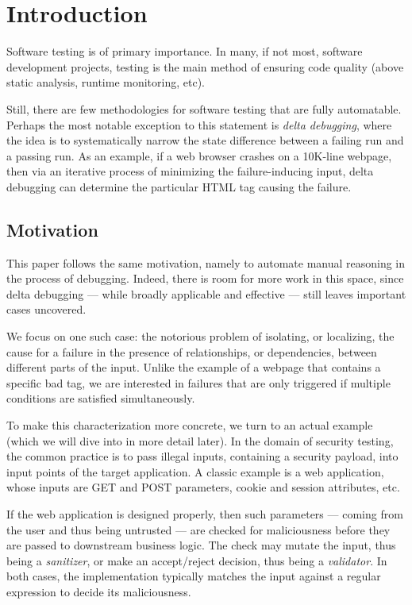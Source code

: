 \section{Introduction}

Software testing is of primary importance. In many, if not most, software development projects, testing is the main method of ensuring code quality (above static analysis, runtime monitoring, etc).

Still, there are few methodologies for software testing that are fully automatable. Perhaps the most notable exception to this statement is \emph{delta debugging}, where the idea is to systematically narrow the state difference between a failing run and a passing run. As an example, if a 
web browser crashes on a 10K-line webpage, then via an iterative process of minimizing the failure-inducing input, delta debugging can determine the particular HTML tag causing the failure.

\subsection{Motivation} This paper follows the same motivation, namely to automate manual reasoning in the process of debugging. Indeed, there is room for more work in this space, since delta debugging --- while broadly applicable and effective --- still leaves important cases uncovered.

We focus on one such case: the notorious problem of isolating, or localizing, the cause for a failure in the presence of relationships, or dependencies, between different parts of the input. Unlike the example of a webpage that contains a specific bad tag, we are interested in failures that are only triggered if multiple conditions are satisfied simultaneously.

To make this characterization more concrete, we turn to an actual example (which we will dive into in more detail later). In the domain of security testing, the common practice is to pass illegal inputs, containing a security payload, into input points of the target application. A classic example is a web application, whose inputs are GET and POST parameters, cookie and session attributes, etc.

If the web application is designed properly, then such parameters --- coming from the user and thus being untrusted --- are checked for maliciousness before they are passed to downstream business logic. The check may mutate the input, thus being a \emph{sanitizer}, or make an accept/reject decision, thus being a \emph{validator}. In both cases, the implementation typically matches the input against a regular expression to decide its maliciousness.

